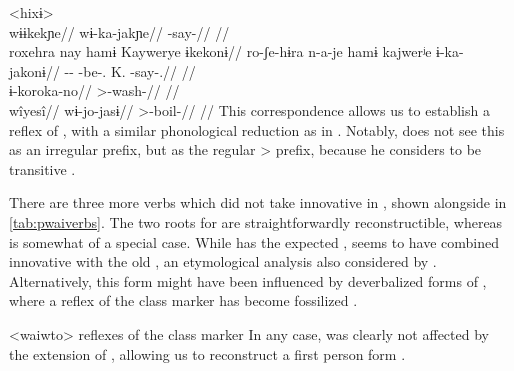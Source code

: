 \pex<hixɨ>
 \waiwai \parencite[][71]{waiwaihawkins1998}\\
\begingl
\glpreamble wɨɨkekɲe//
\gla wɨ-ka-jakɲe//
\glb {}-say-//
\glft {}//
\endgl
{} \hixka \parencite[][124]{hixkaryanaderby1985}\\
\begingl
\glpreamble roxehra nay hamɨ Kaywerye ɨkekonɨ//
\gla ro-ʃe-hɨra n-a-je hamɨ kajwerʲe ɨ-ka-jakonɨ//
\glb {}-- -be-.  K. -say-.//
\glft {}//
\endgl
{} \hixka \parencite[][191]{hixkaryanaderby1985}\\
\begingl
\gla ɨ-koroka-no//
\glb {}>-wash-//
\glft {}//
\endgl
{} \waiwai \parencite[][192]{waiwaihawkins1998}\\
\begingl
\glpreamble wîyesî//
\gla wɨ-jo-jasɨ//
\glb {}>-boil-//
\glft {}//
\endgl
\xe
%
This correspondence allows us to establish \hixka {} a reflex of , with a similar phonological reduction as in \ikpeng {}.
Notably, \textcite{hixkaryanaderby1985} does not see this  as an irregular  prefix, but as the regular > prefix, because he considers \hixka {}  to be transitive  .

There are three more verbs which did not take innovative  in \PWai, shown alongside   in \cref{tab:pwaiverbs}.
The two roots for  are straightforwardly reconstructible, whereas  is somewhat of a special case.
While \hixka has the expected , \waiwai seems to have combined innovative  with the old , an etymological analysis also considered by \textcite[90]{gildea1998}.
Alternatively, this form might have been influenced by deverbalized forms of , where a reflex of the  class marker  has become fossilized .

\pex<waiwto> \waiwai reflexes of the  class marker 
\a {}  \parencite[92]{waiwaihawkins1998}
\a {}  \parencite[165]{waiwaihawkins1998}
\a {}  \parencite[204]{waiwaihawkins1998}
\xe
%
In any case, \hixka {} was clearly not affected by the extension of , allowing us to reconstruct a \PWai first person form .

